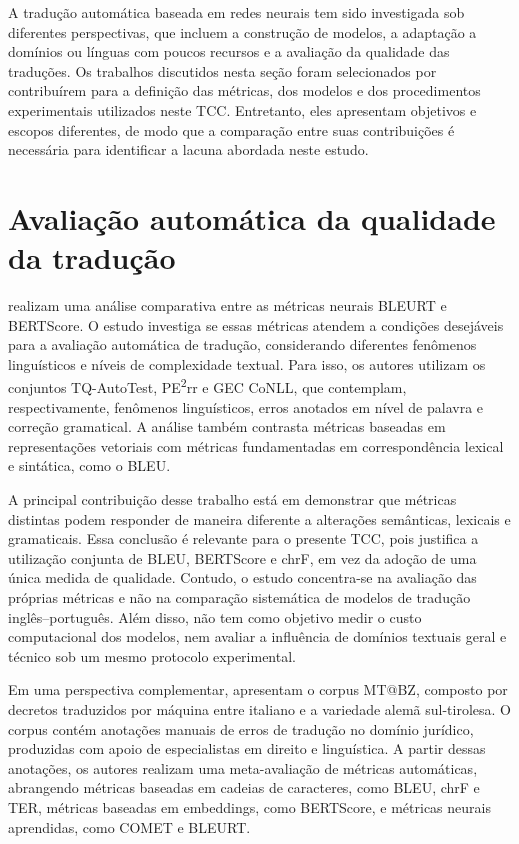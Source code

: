 A tradução automática baseada em redes neurais tem sido investigada sob diferentes perspectivas, que incluem a construção de modelos, a adaptação a domínios ou línguas com poucos recursos e a avaliação da qualidade das traduções. Os trabalhos discutidos nesta seção foram selecionados por contribuírem para a definição das métricas, dos modelos e dos procedimentos experimentais utilizados neste TCC. Entretanto, eles apresentam objetivos e escopos diferentes, de modo que a comparação entre suas contribuições é necessária para identificar a lacuna abordada neste estudo.

\section{Avaliação automática da qualidade da tradução}

\cite{mukherjee2025detailed} realizam uma análise comparativa entre as métricas neurais BLEURT e BERTScore. O estudo investiga se essas métricas atendem a condições desejáveis para a avaliação automática de tradução, considerando diferentes fenômenos linguísticos e níveis de complexidade textual. Para isso, os autores utilizam os conjuntos TQ-AutoTest, PE\textsuperscript{2}rr e GEC CoNLL, que contemplam, respectivamente, fenômenos linguísticos, erros anotados em nível de palavra e correção gramatical. A análise também contrasta métricas baseadas em representações vetoriais com métricas fundamentadas em correspondência lexical e sintática, como o BLEU.

A principal contribuição desse trabalho está em demonstrar que métricas distintas podem responder de maneira diferente a alterações semânticas, lexicais e gramaticais. Essa conclusão é relevante para o presente TCC, pois justifica a utilização conjunta de BLEU, BERTScore e chrF, em vez da adoção de uma única medida de qualidade. Contudo, o estudo concentra-se na avaliação das próprias métricas e não na comparação sistemática de modelos de tradução inglês--português. Além disso, não tem como objetivo medir o custo computacional dos modelos, nem avaliar a influência de domínios textuais geral e técnico sob um mesmo protocolo experimental.

Em uma perspectiva complementar, \cite{di2025meta} apresentam o corpus MT@BZ, composto por decretos traduzidos por máquina entre italiano e a variedade alemã sul-tirolesa. O corpus contém anotações manuais de erros de tradução no domínio jurídico, produzidas com apoio de especialistas em direito e linguística. A partir dessas anotações, os autores realizam uma meta-avaliação de métricas automáticas, abrangendo métricas baseadas em cadeias de caracteres, como BLEU, chrF e TER, métricas baseadas em embeddings, como BERTScore, e métricas neurais aprendidas, como COMET e BLEURT.

